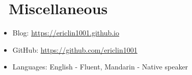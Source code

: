 \documentclass{resume}
\begin{document}
		\section{\faInfo\ Miscellaneous}
		\begin{itemize}[parsep=0.5ex]
			\item Blog: \url{https://ericlin1001.github.io}
			\item GitHub: \url{https://github.com/ericlin1001}
			\item Languages: English - Fluent, Mandarin - Native speaker
		\end{itemize}

		
\end{document}
